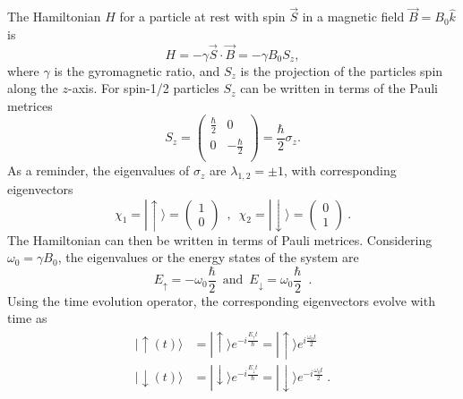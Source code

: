 The Hamiltonian $H$ for a particle at rest with spin $\vec{S}$ in a magnetic
field $\vec{B} = B_{0} \hat{k}$ is
%
\begin{equation}
H = - \gamma \vec{S} \cdot \vec{B}  = - \gamma B_{0} S_{z},
\end{equation}
%
where $\gamma$ is the gyromagnetic ratio, and $S_{z}$ is the
projection of the particles spin along the $z$-axis. For spin-1/2
particles $S_z$ can be written in terms of the Pauli metrices
\begin{equation}
  S_{z} = \left( \begin{array}{cc}
                   \frac{\hbar}{2} & 0  \\
                   0 & -\frac{\hbar}{2} \\
                 \end{array} \right) = \frac{\hbar}{2} \sigma_{z}.
\end{equation}
As a reminder, the eigenvalues of $\sigma_z$ are
$ \lambda_{1,2} = \pm 1$, with corresponding eigenvectors
\begin{equation}
   \chi_{1} = |\uparrow\rangle = 
    \begin{pmatrix}
        1 \\
        0
     \end{pmatrix} \,\,\, ,  \,\,\,   
    \chi_{2} = |\downarrow\rangle = 
    \begin{pmatrix}
        0 \\
        1
     \end{pmatrix}~.
\end{equation}
%
The Hamiltonian can then be written in terms of Pauli metrices. Considering $\omega_{0} = \gamma B_{0}$, the eigenvalues or the energy states of the system are
%
\begin{equation}
  E_{\uparrow} = -\omega_{0} \frac{\hbar}{2} \,\,\, \textrm{and} \,\,\, E_{\downarrow} = \omega_{0} \frac{\hbar}{2} \,\,\, .
\end{equation}
Using the time evolution operator, the corresponding eigenvectors
evolve with time as
  \begin{align}
    |\uparrow (t)\rangle &= |\uparrow\rangle e^{ -i \frac{E_{\uparrow} t}{\hbar}} = |\uparrow\rangle e^{i \frac{\omega_{0}t}{2}}\\
    |\downarrow (t)\rangle &= |\downarrow\rangle e^{ -i \frac{E_{\downarrow} t}{\hbar}} = |\downarrow\rangle e^{-i \frac{\omega_{0}t}{2}}~.
   \end{align}
